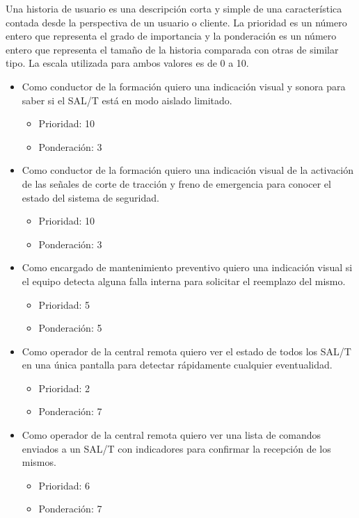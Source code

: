 \documentclass[11pt]{charter}
\begin{document}
Una historia de usuario es una descripción corta y simple de una característica contada desde la perspectiva de un usuario o cliente. La prioridad es un número entero que representa el grado de importancia y la ponderación es un número entero que representa el tamaño de la historia comparada con otras de similar tipo.
La escala utilizada para ambos valores es de 0 a 10.

\begin{itemize}
  \item Como conductor de la formación quiero una indicación visual y sonora para saber si el SAL/T está en modo aislado limitado.
  \begin{itemize}
    \item Prioridad: 10
    \item Ponderación: 3
  \end{itemize}
  \item Como conductor de la formación quiero una indicación visual de la activación de las señales de corte de tracción y freno de emergencia para conocer el estado del sistema de seguridad.
  \begin{itemize}
    \item Prioridad: 10
    \item Ponderación: 3
  \end{itemize}
  \item Como encargado de mantenimiento preventivo quiero una indicación visual si el equipo detecta alguna falla interna para solicitar el reemplazo del mismo.
  \begin{itemize}
    \item Prioridad: 5
    \item Ponderación: 5
  \end{itemize}
  \item Como operador de la central remota quiero ver el estado de todos los SAL/T en una única pantalla para detectar rápidamente cualquier eventualidad.
  \begin{itemize}
    \item Prioridad: 2
    \item Ponderación: 7
  \end{itemize}
  \item Como operador de la central remota quiero ver una lista de comandos enviados a un SAL/T con indicadores para confirmar la recepción de los mismos.
  \begin{itemize}
    \item Prioridad: 6
    \item Ponderación: 7
  \end{itemize}
\end{itemize}
\end{document}
